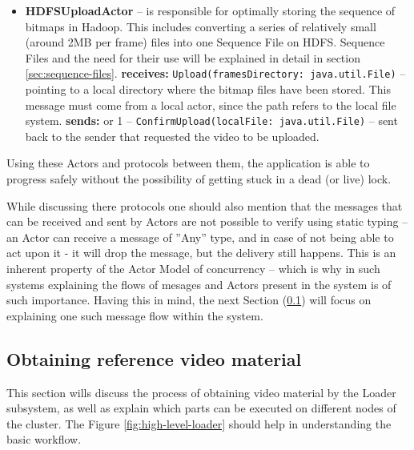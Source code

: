 \begin{itemize}
  \item \textbf{HDFSUploadActor} -- is responsible for optimally storing the sequence of bitmaps in Hadoop. This includes converting a series of 
                                  relatively small (around 2MB per frame) files into one Sequence File on HDFS. Sequence Files and the need for their use
                                  will be explained in detail in section \ref{sec:sequence-files}.
  \subitem \textbf{receives:}
    \subsubitem \verb|Upload(framesDirectory: java.util.File)| -- pointing to a local directory where the bitmap files have been stored.
                                                                 This message must come from a local actor, since the path refers to the local file system.
    \subitem  \textbf{sends:}
       or 1 -- \verb|ConfirmUpload(localFile: java.util.File)| -- sent back to the sender that requested the video to be uploaded.
\end{itemize}

Using these Actors and protocols between them, the application is able to progress safely without the possibility of getting stuck in a dead (or live) lock. 

While discussing there protocols one should also mention that the messages that can be received and sent by Actors are not possible to verify using static typing -- an Actor can receive a message of ''Any'' type, and in case of not being able to act upon it - it will drop the message, but the delivery still happens.
This is an inherent property of the Actor Model of concurrency -- which is why in such systems explaining the flows of mesages and Actors present in the system is of such importance. Having this in mind, the next Section (\ref{sec:obtaining-reference-material}) will focus on explaining one such message flow within the system.

\subsection{Obtaining reference video material}
\label{sec:obtaining-reference-material}
This section wills discuss the process of obtaining video material by the Loader subsystem, as well as explain which parts can be executed on different nodes of the cluster. The Figure \ref{fig:high-level-loader} should help in understanding the basic workflow.

